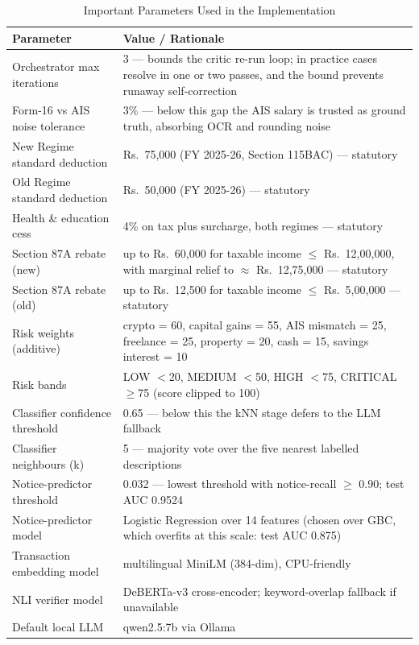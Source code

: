\documentclass[12pt, a4paper, oneside]{report}
\begin{document}
\begin{table}[H]
\centering
\caption{Important Parameters Used in the Implementation}
\label{tab:parameters}
\small
\begin{tabularx}{\textwidth}{|l|X|}
\hline
\textbf{Parameter} & \textbf{Value / Rationale} \\
\hline
Orchestrator max iterations & 3 --- bounds the critic re-run loop; in practice cases resolve in one or two passes, and the bound prevents runaway self-correction \\
\hline
Form-16 vs AIS noise tolerance & 3\% --- below this gap the AIS salary is trusted as ground truth, absorbing OCR and rounding noise \\
\hline
New Regime standard deduction & Rs.~75,000 (FY 2025-26, Section 115BAC) --- statutory \\
\hline
Old Regime standard deduction & Rs.~50,000 (FY 2025-26) --- statutory \\
\hline
Health \& education cess & 4\% on tax plus surcharge, both regimes --- statutory \\
\hline
Section 87A rebate (new) & up to Rs.~60,000 for taxable income $\leq$ Rs.~12,00,000, with marginal relief to $\approx$ Rs.~12,75,000 --- statutory \\
\hline
Section 87A rebate (old) & up to Rs.~12,500 for taxable income $\leq$ Rs.~5,00,000 --- statutory \\
\hline
Risk weights (additive) & crypto = 60, capital gains = 55, AIS mismatch = 25, freelance = 25, property = 20, cash = 15, savings interest = 10 \\
\hline
Risk bands & LOW $<$20, MEDIUM $<$50, HIGH $<$75, CRITICAL $\geq$75 (score clipped to 100) \\
\hline
Classifier confidence threshold & 0.65 --- below this the kNN stage defers to the LLM fallback \\
\hline
Classifier neighbours (k) & 5 --- majority vote over the five nearest labelled descriptions \\
\hline
Notice-predictor threshold & 0.032 --- lowest threshold with notice-recall $\geq$ 0.90; test AUC 0.9524 \\
\hline
Notice-predictor model & Logistic Regression over 14 features (chosen over GBC, which overfits at this scale: test AUC 0.875) \\
\hline
Transaction embedding model & multilingual MiniLM (384-dim), CPU-friendly \\
\hline
NLI verifier model & DeBERTa-v3 cross-encoder; keyword-overlap fallback if unavailable \\
\hline
Default local LLM & qwen2.5:7b via Ollama \\
\hline
\end{tabularx}
\end{table}
\end{document}
